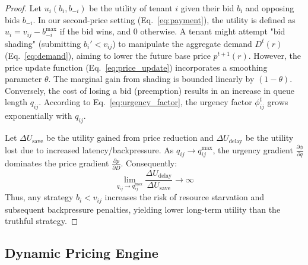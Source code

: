 \documentclass[lettersize,journal]{IEEEtran}
\begin{document}
\begin{proof}
Let $u_i(b_i, b_{-i})$ be the utility of tenant $i$ given their bid $b_i$ and opposing bids $b_{-i}$. In our second-price setting (Eq.~\ref{eq:payment}), the utility is defined as $u_i = v_{ij} - b_{-i}^{\max}$ if the bid wins, and $0$ otherwise. A tenant might attempt "bid shading" (submitting $b_i' < v_{ij}$) to manipulate the aggregate demand $D^t(r)$ (Eq.~\ref{eq:demand}), aiming to lower the future base price $p^{t+1}(r)$.
However, the price update function (Eq.~\ref{eq:price_update}) incorporates a smoothing parameter $\theta$. The marginal gain from shading is bounded linearly by $(1-\theta)$. Conversely, the cost of losing a bid (preemption) results in an increase in queue length $q_{ij}$. According to Eq.~\ref{eq:urgency_factor}, the urgency factor $\phi_{ij}^t$ grows exponentially with $q_{ij}$.

Let $\Delta U_{\text{save}}$ be the utility gained from price reduction and $\Delta U_{\text{delay}}$ be the utility lost due to increased latency/backpressure. As $q_{ij} \to q_{ij}^{\max}$, the urgency gradient $\frac{\partial \phi}{\partial q}$ dominates the price gradient $\frac{\partial p}{\partial D}$. Consequently:
\begin{equation}
\lim_{q_{ij} \to q_{ij}^{\max}} \frac{\Delta U_{\text{delay}}}{\Delta U_{\text{save}}} \to \infty
\end{equation}
Thus, any strategy $b_i < v_{ij}$ increases the risk of resource starvation and subsequent backpressure penalties, yielding lower long-term utility than the truthful strategy.
\end{proof}


\subsection{Dynamic Pricing Engine}
\label{subsec:pricing_engine}
\end{document}

